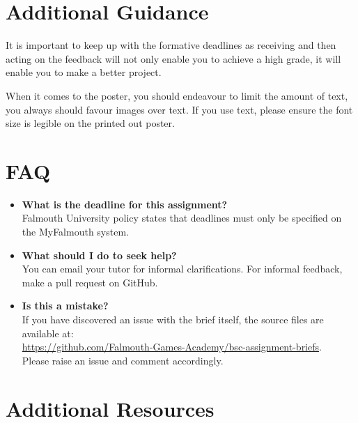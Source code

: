 \documentclass{../../fal_assignment}
\begin{document}
\section*{Additional Guidance}

It is important to keep up with the formative deadlines as receiving and then acting on the feedback will not only enable you to achieve a high grade, it will enable you to make a better project. 

When it comes to the poster, you should endeavour to limit the amount of text, you always should favour images over text. If you use text, please ensure the font size is legible on the printed out poster.

\section*{FAQ}

\begin{itemize}
	\item 	\textbf{What is the deadline for this assignment?} \\ 
    		Falmouth University policy states that deadlines must only be specified on the MyFalmouth system.
    		
	\item 	\textbf{What should I do to seek help?} \\ 
    		You can email your tutor for informal clarifications. For informal feedback, make a pull request on GitHub. 
    		
    	\item 	\textbf{Is this a mistake?} \\ 	
    		If you have discovered an issue with the brief itself, the source files are available at: \\
    		\url{https://github.com/Falmouth-Games-Academy/bsc-assignment-briefs}.\\
    		 Please raise an issue and comment accordingly.
\end{itemize}

\section*{Additional Resources}
\end{document}
